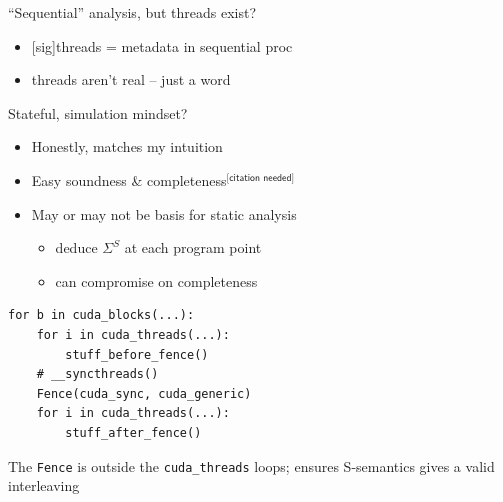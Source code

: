 \begin{minipage}[t]{0.48\textwidth}\fixminipage
{}

``Sequential'' analysis, but threads exist?
\begin{itemize}
  \item {[sig]}threads = metadata in sequential proc
  \item threads aren't real -- just a word
\end{itemize}
Stateful, simulation mindset?
\begin{itemize}
  \item Honestly, matches my intuition
  \item Easy soundness \& completeness$^{\textsf{[citation needed]}}$
  \item May or may not be basis for static analysis
  \begin{itemize}
    \item deduce $\Sigma^S$ at each program point
    \item can compromise on completeness
  \end{itemize}
\end{itemize}


\begin{verbatim}
for b in cuda_blocks(...):
    for i in cuda_threads(...):
        stuff_before_fence()
    # __syncthreads()
    Fence(cuda_sync, cuda_generic)
    for i in cuda_threads(...):
        stuff_after_fence()
\end{verbatim}
The \texttt{Fence} is outside the \texttt{cuda\_threads} loops; ensures S-semantics gives a valid interleaving
\end{minipage}

\newpage
{}


